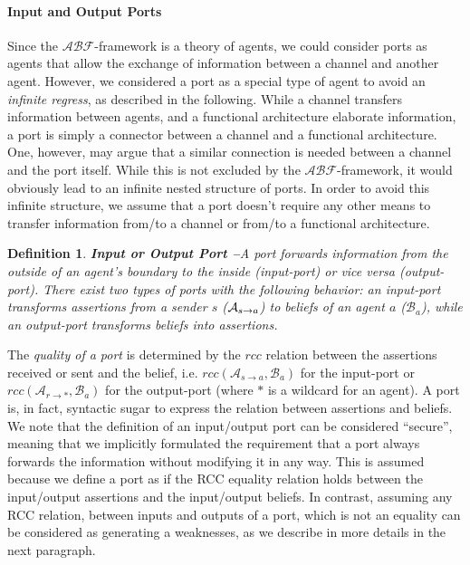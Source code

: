 \documentclass[conference]{IEEEtran}
\newcommand{\assertionRegion}{\mathcal{A}}
\newcommand{\beliefRegion}{\mathcal{B}}
\newcommand{\factRegion}{\mathcal{F}}
\newcommand{\rcc}{rcc}
\newcommand{\abftheory}{\assertionRegion\beliefRegion\factRegion}
\newcommand{\Rcc}[2]{rcc(#1,#2)}
\newcommand{\rassert}[3]{\mathcal{A}_{#1\rightarrow #2}#3}
\newtheorem{definition}{Definition}%
\begin{document}
\paragraph{Input and Output Ports}
Since the $\abftheory$-framework is a theory of agents, we could consider ports as
agents that allow the exchange of information between a channel and another
agent.  However, we considered a port as a special type of agent to avoid
an \emph{infinite regress}, as described in the following. While a channel transfers information between agents, and
a functional architecture elaborate information, a port is simply a connector between
a channel and a functional architecture. One, however, may argue that a similar
connection is needed between a channel and the port itself. While this is not 
excluded by the $\abftheory$-framework, it would obviously lead to an infinite
nested structure of ports. In order to avoid this infinite structure, we assume
that a port doesn't require any other means to transfer information from/to a channel
or from/to a functional architecture. 

\begin{definition}{\bf Input or Output Port --}\label{def:port} 
	A port forwards information from the outside of an agent's boundary to
	the inside (input-port) or vice versa (output-port).  There exist two
	types of ports with the following behavior: an input-port 
	transforms assertions from a sender $s$ ($\rassert{s}{a}$) to beliefs
	of an agent $a$ ($\beliefRegion_a$), while an output-port transforms beliefs
	into assertions.
\end{definition}
The \emph{quality of a port} is determined by the $\rcc$ relation between the
assertions received or sent and the belief, i.e.
$\Rcc{\rassert{s}{a}}{\beliefRegion_a}$ for the input-port or
$\Rcc{\rassert{r}{*}}{\beliefRegion_a}$ for the output-port (where $*$ is a wildcard for an agent).  A port is, in
fact, syntactic sugar to express the relation between assertions and beliefs.
We note that the definition of an input/output port can
be considered ``secure'', meaning that we implicitly formulated the requirement
that a port always forwards the information without modifying it in any way.
This is assumed because we define a port as if the RCC equality relation holds
between the input/output assertions and the input/output beliefs.  In contrast,
assuming any RCC relation, between inputs and outputs of a port, which is not
an equality can be considered as generating a weaknesses, as we describe in
more details in the next paragraph.
\end{document}
